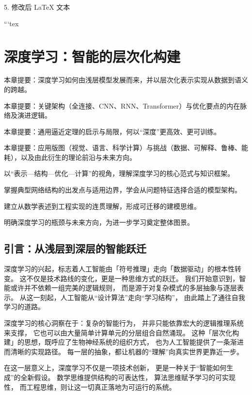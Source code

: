 5. 修改后 LaTeX 文本

```tex
\chapter{深度学习：智能的层次化构建}

\begin{introduction}
  \item 本章提要：深度学习如何由浅层模型发展而来，并以层次化表示实现从数据到语义的跨越。
  \item 本章提要：关键架构（全连接、CNN、RNN、Transformer）与优化要点的内在脉络及演进逻辑。
  \item 本章提要：通用逼近定理的启示与局限，何以“深度”更高效、更可训练。
  \item 本章提要：应用版图（视觉、语言、科学计算）与挑战（数据、可解释、鲁棒、能耗），以及由此衍生的理论前沿与未来方向。
\end{introduction}

\begin{introduction}
  \item 以“表示—结构—优化—计算”的视角，理解深度学习的核心范式与知识框架。
  \item 掌握典型网络结构的出发点与适用边界，学会从问题特征选择合适的模型架构。
  \item 建立从数学表述到工程实现的连贯理解，形成可迁移的建模思维。
  \item 明确深度学习的瓶颈与未来方向，为进一步学习奠定整体图景。
\end{introduction}

\section{引言：从浅层到深层的智能跃迁}

深度学习的兴起，标志着人工智能由「符号推理」走向「数据驱动」的根本性转变。  
这不仅是技术路线的变化，更是一种思维方式的跃迁。  
我们开始意识到，智能或许并不依赖一组完美的逻辑规则，  
而是源于对复杂模式的多层抽象与逐层表示。  
从这一刻起，人工智能从“设计算法”走向“学习结构”，  
由此踏上了通往自我学习的道路。

深度学习的核心洞察在于：复杂的智能行为，  
并非只能依靠宏大的逻辑推理系统来支撑，  
它也可以由大量简单计算单元的分层组合自然涌现。  
这种「层次化构建」的思想，既呼应了生物神经系统的组织方式，  
也为人工智能提供了一条渐进而清晰的实现路径。  
每一层的抽象，都让机器的“理解”向真实世界更靠近一步。  

在这一层意义上，深度学习不仅是一项技术创新，  
更是一种关于“智能如何生成”的全新假设。  
数学思维提供结构的可表达性，  
算法思维赋予学习的可实现性，  
而工程思维，则让这一切真正落地为可运行的系统。

